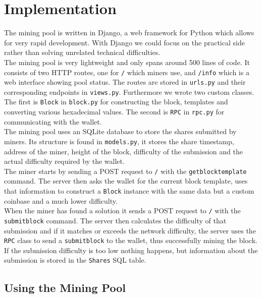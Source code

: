 \section{Implementation}

The mining pool is written in Django, a web framework for Python which allows for very rapid development. With Django we could focus on the practical side rather than solving unrelated technical difficulties. \\

The mining pool is very lightweight and only spans around 500 lines of code. It consists of two HTTP routes, one for \texttt{/} which miners use, and \texttt{/info} which is a web interface showing pool status. The routes are stored in \texttt{urls.py} and their corresponding endpoints in \texttt{views.py}. Furthermore we wrote two custom classes. The first is \texttt{Block} in \texttt{block.py} for constructing the block, templates and converting various hexadecimal values. The second is \texttt{RPC} in \texttt{rpc.py} for communicating with the wallet. \\

The mining pool uses an SQLite database to store the shares submitted by miners. Its structure is found in \texttt{models.py}, it stores the share timestamp, address of the miner, height of the block, difficulty of the submission and the actual difficulty required by the wallet. \\

The miner starts by sending a POST request to \texttt{/} with the \texttt{getblocktemplate} command. The server then asks the wallet for the current block template, uses that information to construct a \texttt{Block} instance with the same data but a custom coinbase and a much lower difficulty. \\

When the miner has found a solution it sends a POST request to \texttt{/} with the \texttt{submitblock} command. The server then calculates the difficulty of that submission and if it matches or exceeds the network difficulty, the server uses the \texttt{RPC} class to send a \texttt{submitblock} to the wallet, thus successfully mining the block. If the submission difficulty is too low nothing happens, but information about the submission is stored in the \texttt{Shares} SQL table.

\subsection{Using the Mining Pool}

